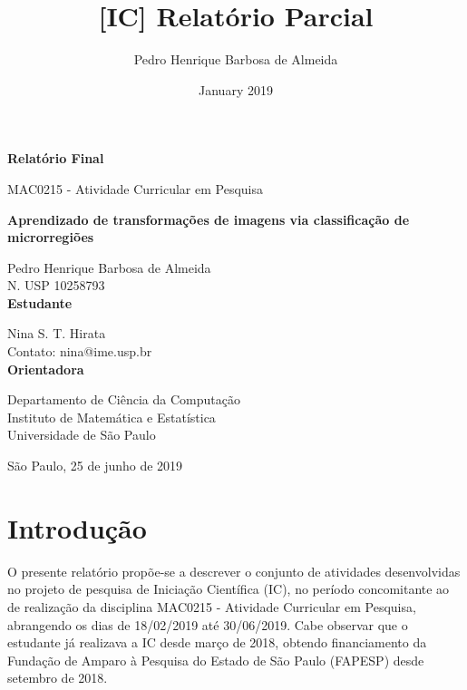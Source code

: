 \documentclass{article}
\title{[IC] Relatório Parcial}
\author{Pedro Henrique Barbosa de Almeida}
\date{January 2019}
\begin{document}
	
	\thispagestyle{empty}
	
	
	\begin{center}
		{\bf \Large Relatório Final}
		
		MAC0215 - Atividade Curricular em Pesquisa
	\end{center}
	
	\bigskip
	\begin{center}
		{\bf \LARGE Aprendizado de transformações de imagens via classificação de  microrregiões}
		
		\bigskip
		\bigskip
		{\large Pedro Henrique Barbosa de Almeida} \\
		{N. USP 10258793} \\
		{\bf Estudante}
		
		\bigskip
		\bigskip
		{\large Nina S. T. Hirata}\\ 
		Contato: nina@ime.usp.br \\
		{\bf Orientadora}
		
		\bigskip
		\bigskip
		\bigskip
		\bigskip
		
		\bigskip
		\bigskip
		
		\bigskip
		\bigskip
		
		\bigskip
		\bigskip
		\bigskip
		\bigskip
		\bigskip
		\bigskip
		\bigskip
		\bigskip
		
		\bigskip
		\bigskip
		\bigskip
		\bigskip
		\bigskip
		\bigskip
		\bigskip
		\bigskip
		
		{\large Departamento de Ciência da Computação \\
			Instituto de Matemática e Estatística \\
			Universidade de São Paulo} \\
		
		\bigskip
		\bigskip
		
		São Paulo, 25 de junho de 2019
	\end{center}
	\newpage	
	\thispagestyle{empty}
	\tableofcontents
	
	\newpage
	
	\listoffigures
	
	\newpage
	
	\listoftables
	
	\newpage 
	
	\setcounter{page}{2}
	
	\section{Introdução}
	
	O presente relatório propõe-se a descrever o conjunto de atividades desenvolvidas no projeto de pesquisa de Iniciação Científica (IC), no período concomitante ao de realização da disciplina MAC0215 - Atividade Curricular em Pesquisa, abrangendo os dias de 18/02/2019 até 30/06/2019. Cabe observar que o estudante já realizava a IC desde março de 2018, obtendo financiamento da Fundação de Amparo à Pesquisa do Estado de São Paulo (FAPESP) desde setembro de 2018. 
	
\end{document}
